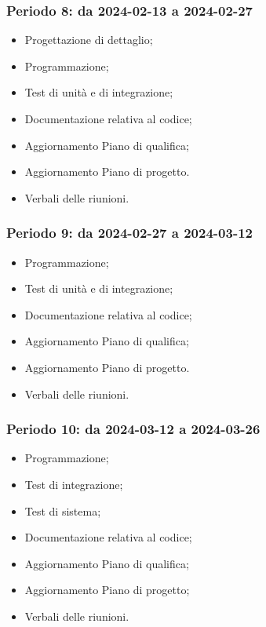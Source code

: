\documentclass[10pt, a4paper]{article}
\begin{document}
{{{{{{{{\subsubsection{Periodo 8: da 2024-02-13 a 2024-02-27}
%
\begin{itemize}
    \item Progettazione di dettaglio;
    \item Programmazione;
    \item Test di unità e di integrazione;
    \item Documentazione relativa al codice;
    \item Aggiornamento Piano di qualifica;
    \item Aggiornamento Piano di progetto.
    \item Verbali delle riunioni.
\end{itemize}

\subsubsection{Periodo 9: da 2024-02-27 a 2024-03-12}
%
\begin{itemize}
    \item Programmazione;
    \item Test di unità e di integrazione;
    \item Documentazione relativa al codice;
    \item Aggiornamento Piano di qualifica;
    \item Aggiornamento Piano di progetto.
    \item Verbali delle riunioni.
\end{itemize}

\subsubsection{Periodo 10: da 2024-03-12 a 2024-03-26}
%
\begin{itemize}
    \item Programmazione;
    \item Test di integrazione;
    \item Test di sistema;
    \item Documentazione relativa al codice;
    \item Aggiornamento Piano di qualifica;
    \item Aggiornamento Piano di progetto;
    \item Verbali delle riunioni.
\end{itemize}
}}}}}}}}
\end{document}
